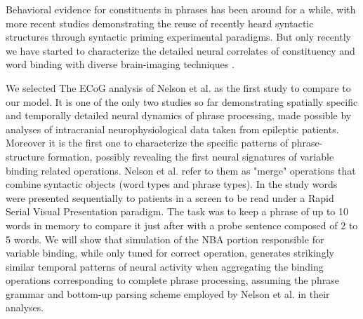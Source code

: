 \documentclass[10pt]{article}
\begin{document}
Behavioral evidence for constituents in phrases has been around for a while\cite{bever1969underlying, abrams1969syntactic}, with more recent studies demonstrating the reuse of 
recently heard syntactic structures through syntactic priming experimental paradigms\cite{bock2007persistent, branigan2000syntactic}.
But only recently we have started to characterize the detailed neural correlates of constituency and word binding with diverse brain-imaging techniques
\cite{Nelson_2017, fedorenko2016neural, brennan2016abstract, ding2016cortical, bemis2012basic, Pallier_2011, bastiaansen2010syntactic, longe2006grammatical}.

We selected The ECoG analysis of Nelson et al.\cite{Nelson_2017} as the first study to compare to our model.
It is one of the only two studies so far demonstrating spatially specific and temporally detailed neural dynamics of phrase processing, 
made possible by analyses of intracranial neurophysiological data taken from epileptic patients.
Moreover it is the first one to characterize the specific patterns of phrase-structure formation, possibly revealing the first neural signatures of variable binding 
related operations. Nelson et al. refer to them as "merge" operations that combine syntactic objects (word types and phrase types).
In the study words were presented sequentially to patients in a screen to be read under a Rapid Serial Visual Presentation paradigm.
The task was to keep a phrase of up to 10 words in memory to compare it just after with a probe sentence composed of 2 to 5 words.
We will show that simulation of the NBA portion responsible for variable binding, while only tuned for correct operation, generates strikingly similar temporal patterns of 
neural activity when aggregating the binding operations corresponding to complete phrase processing, assuming the phrase grammar and bottom-up parsing scheme employed by 
Nelson et al. in their analyses.
\end{document}
